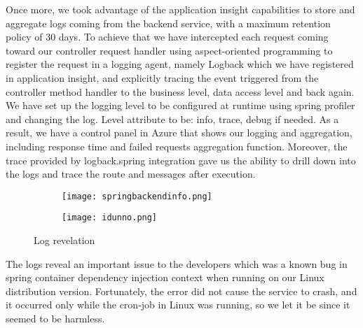 Once more, we took advantage of the application insight capabilities to store and aggregate logs coming from the backend service, with a maximum retention policy of 30 days. To achieve that we have intercepted each request coming toward our controller request handler using aspect-oriented programming to register the request in a logging agent, namely Logback which we have registered in application insight, and explicitly tracing the event triggered from the controller method handler to the business level, data access level and back again. We have set up the logging level to be configured at runtime using spring profiler and changing the log. Level attribute to be: info, trace, debug if needed. As a result, we have a control panel in Azure that shows our logging and aggregation, including response time and failed requests aggregation function. Moreover, the trace provided by logback.spring integration gave us the ability to drill down into the logs and trace the route and messages after execution.
\begin{figure}
    \centering
    \begin{subfigure}[b]{0.45\textwidth}
        \texttt{[image: springbackendinfo.png]}
    \end{subfigure}
    \hfill
    \begin{subfigure}[b]{0.45\textwidth}
        \texttt{[image: idunno.png]}
    \end{subfigure}
    \caption{Log revelation}
    \label{fig:screenshots}
\end{figure}
The logs reveal an important issue to the developers which was a known bug in spring container dependency injection context when running on our Linux distribution version. Fortunately, the error did not cause the service to crash, and it occurred only while the cron-job in Linux was running, so we let it be since it seemed to be harmless.
